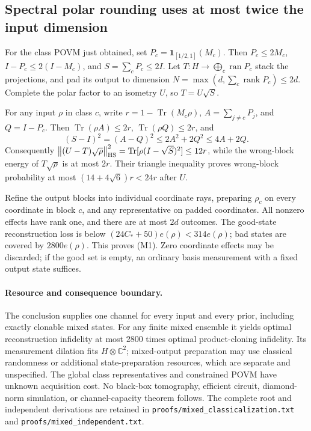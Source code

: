 \documentclass[11pt]{article}
\newcommand{\Tr}{\operatorname{Tr}}
\newcommand{\norm}[1]{\left\lVert#1\right\rVert}
\begin{document}
\subsection{Spectral polar rounding uses at most twice the input dimension}

For the class POVM just obtained, set $P_c=\mathbf1_{[1/2,1]}(M_c)$. Then $P_c\le2M_c$, $I-P_c\le2(I-M_c)$, and $S=\sum_cP_c\le2I$. Let $T:H\to\bigoplus_c\operatorname{ran}P_c$ stack the projections, and pad its output to dimension $N=\max(d,\sum_c\operatorname{rank}P_c)\le2d$. Complete the polar factor to an isometry $U$, so $T=U\sqrt S$.

For any input $\rho$ in class $c$, write $r=1-\Tr(M_c\rho)$, $A=\sum_{j\ne c}P_j$, and $Q=I-P_c$. Then $\Tr(\rho A)\le2r$, $\Tr(\rho Q)\le2r$, and
\[
(S-I)^2=(A-Q)^2\le2A^2+2Q^2\le4A+2Q.
\]
Consequently $\norm{(U-T)\sqrt\rho}_{\rm HS}^2=\Tr[\rho(I-\sqrt S)^2]\le12r$, while the wrong-block energy of $T\sqrt\rho$ is at most $2r$. Their triangle inequality proves wrong-block probability at most $(14+4\sqrt6)r<24r$ after $U$.

Refine the output blocks into individual coordinate rays, preparing $\rho_c$ on every coordinate in block $c$, and any representative on padded coordinates. All nonzero effects have rank one, and there are at most $2d$ outcomes. The good-state reconstruction loss is below $(24C_*+50)e(\rho)<314e(\rho)$; bad states are covered by $2800e(\rho)$. This proves (M1). Zero coordinate effects may be discarded; if the good set is empty, an ordinary basis measurement with a fixed output state suffices.

\paragraph{Resource and consequence boundary.}
The conclusion supplies one channel for every input and every prior, including exactly clonable mixed states. For any finite mixed ensemble it yields optimal reconstruction infidelity at most $2800$ times optimal product-cloning infidelity. Its measurement dilation fits $H\otimes\mathbb C^2$; mixed-output preparation may use classical randomness or additional state-preparation resources, which are separate and unspecified. The global class representatives and constrained POVM have unknown acquisition cost. No black-box tomography, efficient circuit, diamond-norm simulation, or channel-capacity theorem follows. The complete root and independent derivations are retained in \texttt{proofs/mixed\_classicalization.txt} and \texttt{proofs/mixed\_independent.txt}.
\end{document}
